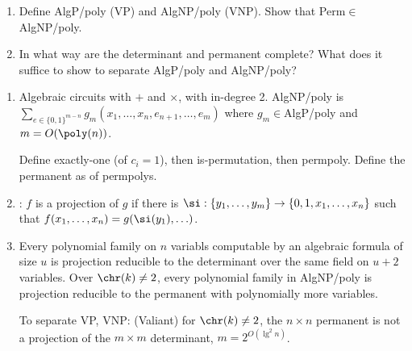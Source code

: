 \begin{enumerate}
\item Define AlgP/poly (VP) and AlgNP/poly (VNP). Show that Perm$\in$AlgNP/poly.
\item In what way are the determinant and permanent complete? What does it suffice to show to separate AlgP/poly and AlgNP/poly?
\end{enumerate}
\begin{enumerate}
\item Algebraic circuits with $+$ and $\times$, with in-degree 2. AlgNP/poly is $\sum_{e\in \{0,1\}^{m-n}} g_m(x_1,\ldots, x_n,e_{n+1},\ldots, e_m)$ where $g_m\in $AlgP/poly and $m=O(\poly(n))$.

Define exactly-one (of $c_i=1$), then is-permutation, then permpoly. Define the permanent as of permpolys.
\item 
{}: $f$ is a projection of $g$ if there is $\si:\{y_1,\ldots, y_m\}\to \{0,1,x_1,\ldots, x_n\}$ such that $f(x_1,\ldots, x_n)=g(\si(y_1),\ldots)$. 
\item Every polynomial family on $n$ variabls computable by an algebraic formula of size $u$ is projection reducible to the determinant over the same field on $u+2$ variables. Over $\chr(k)\ne 2$, every polynomial family in AlgNP/poly is projection reducible to the permanent with polynomially more variables. 

To separate VP, VNP: (Valiant) for $\chr(k)\ne 2$, the $n\times n$ permanent is not a projection of the $m\times m$ determinant, $m=2^{O(\lg^2 n)}$.
\end{enumerate}

